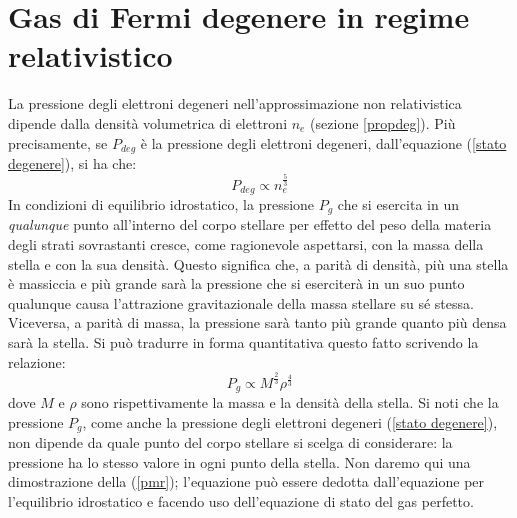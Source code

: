 \section{Gas di Fermi degenere in regime relativistico}
\label{climit}
La pressione degli elettroni degeneri nell'approssimazione non relativistica dipende dalla densit\`{a} volumetrica di elettroni $n_{e}$ (sezione \ref{propdeg}). Pi\`{u} precisamente, se $P_{deg}$ \`{e} la pressione degli elettroni degeneri, dall'equazione (\ref{stato degenere}), si ha che:
\begin{equation}\label{prop53}
P_{deg} \propto n_{e}^{\frac{5}{3}}
\end{equation}
In condizioni di equilibrio idrostatico, la pressione $P_{g}$ che si esercita in
un \emph{qualunque} punto all'interno del corpo stellare per effetto del peso
della materia degli strati sovrastanti cresce, come ragionevole aspettarsi, con
la massa della stella e con la sua densit\`{a}. Questo significa che, a
parit\`{a} di densit\`{a}, pi\`{u} una stella \`{e} massiccia e pi\`{u} grande
sar\`{a} la pressione che si eserciter\`{a} in un suo punto qualunque causa
l'attrazione gravitazionale della massa stellare su s\'e stessa. Viceversa, a
parit\`{a} di massa, la pressione sar\`{a} tanto pi\`{u} grande quanto pi\`{u}
densa sar\`{a} la stella. Si pu\`o tradurre in forma quantitativa questo fatto scrivendo la relazione:
\begin{equation}\label{pmr}
P_{g}\propto M^{\frac{2}{3}}\rho^{\frac{4}{3}}
\end{equation}
dove $M$ e $\rho$ sono rispettivamente la massa e la densit\`{a} della stella. Si noti che la pressione $P_{g}$, come anche la pressione degli elettroni degeneri (\ref{stato degenere}), non dipende da quale punto del corpo stellare si scelga di considerare: la pressione ha lo stesso valore in ogni punto della stella. Non daremo qui una dimostrazione della (\ref{pmr}); l'equazione pu\`{o} essere dedotta dall'equazione per l'equilibrio idrostatico e facendo uso dell'equazione di stato del gas perfetto.
\par
